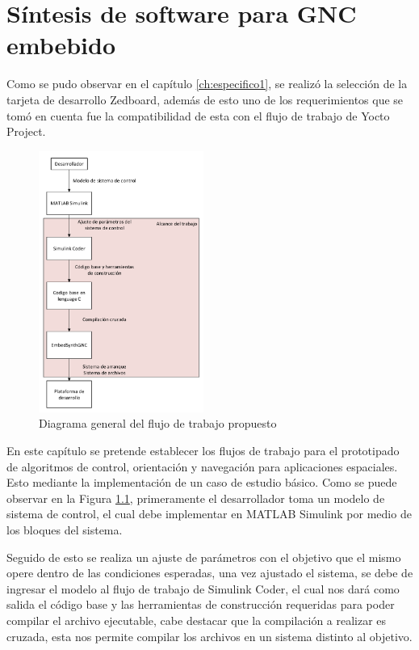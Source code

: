 \chapter{Síntesis de software para GNC embebido}
\label{ch:especifico2}

Como se pudo observar en el capítulo \ref{ch:especifico1}, se realizó la selección de la tarjeta de desarrollo Zedboard, además de esto uno de los requerimientos que se tomó en cuenta fue la compatibilidad de esta con el flujo de trabajo de Yocto Project.

\begin{figure}[h!]
    \centering
    \includegraphics[width=0.48\textwidth]{fig/especifico_2/Diagrama general del proyecto.pdf}
    \caption{Diagrama general del flujo de trabajo propuesto}
    \label{fig:diagrama_flujo_trabajo}
\end{figure}

En este capítulo se pretende establecer los flujos de trabajo para el prototipado de algoritmos de control, orientación y navegación para aplicaciones espaciales. Esto mediante la implementación de un caso de estudio básico. Como se puede observar en la Figura \ref{fig:diagrama_flujo_trabajo}, primeramente el desarrollador toma un modelo de sistema de control, el cual debe implementar en MATLAB Simulink por medio de los bloques del sistema. 

Seguido de esto se realiza un ajuste de parámetros con el objetivo que el mismo opere dentro de las condiciones esperadas, una vez ajustado el sistema, se debe de ingresar el modelo al flujo de trabajo de Simulink Coder, el cual nos dará como salida el código base y las herramientas de construcción requeridas para poder compilar el archivo ejecutable, cabe destacar que la compilación a realizar es cruzada, esta nos permite compilar los archivos en un sistema distinto al objetivo. 

